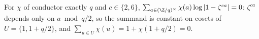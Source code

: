 For $\chi$ of conductor exactly $q$ and $c\in\{2,6\}$, $\sum_{a\in(\Z/q)^\times}\chi(a)\log|1-\zeta^{ca}|=0$: $\zeta^{ca}$ depends only on $a\bmod q/2$, so the summand is constant on cosets of $U=\{1,1+q/2\}$, and $\sum_{u\in U}\chi(u)=1+\chi(1+q/2)=0$.

